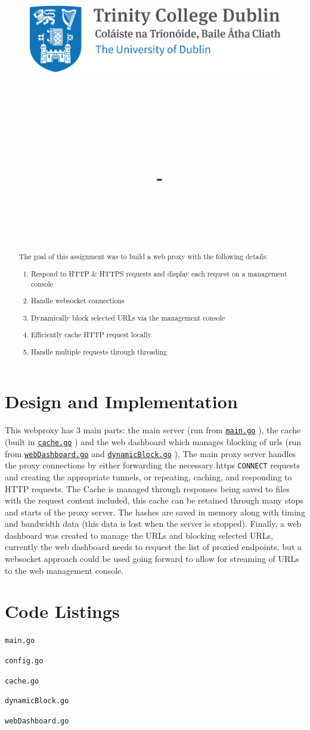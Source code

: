 \documentclass{article}
\title{
    \vspace{-1in}
    \begin{figure}[!ht]
    \flushleft
    \includegraphics[width=0.4\linewidth]{reduced-trinity.png}
    \end{figure}
    \vspace{-0.5cm}
    \hrulefill \\
    \vspace{1cm}
    \textmd{\textbf{\moduleCode\ \moduleName}}\\
    \textmd{\textbf{\assignmentTitle}}\\
    \textmd{\authorName\ - \authorID}\\
    \textmd{\reportDate}\\
    \vspace{0.5cm}
    \hrulefill \\
}
\date{}
\author{}
\newcommand{\code}[1]{\colorbox{light-gray}{\texttt{#1}}}
\newcommand{\codelisting}[1]{
  \code{#1}
  \label{code:#1}
  
  \vspace{2em}
}
\newcommand{\coderef}[1]{
  \hyperref[code:#1]{\code{#1}}
}
\begin{document}
    \lstset{language=bash, float=h, captionpos=b, frame=single, numbers=left, numberblanklines=false, numberstyle=\tiny, numbersep=1mm, framexleftmargin=3mm, xleftmargin=5mm, aboveskip=3mm, breaklines=true}
    \captionsetup{width=.8\linewidth} 

    \maketitle
    \begin{abstract}
      The goal of this assignment was to build a web proxy with the following details:
      \begin{enumerate}
        \item Respond to HTTP \& HTTPS requests and display each request on a management console
        \item Handle websocket connections
        \item Dynamically block selected URLs via the management console
        \item Efficiently cache HTTP request locally
        \item Handle multiple requests through threading
      \end{enumerate}
    \end{abstract}
    \tableofcontents
    \newpage
    
    \section{Design and Implementation}
    \label{sec:Design}
    This webproxy has 3 main parts: the main server (run from \coderef{main.go}), the cache (built in \coderef{cache.go}) and the web dashboard which manages blocking of urls (run from \coderef{webDashboard.go} and \coderef{dynamicBlock.go}). The main proxy server handles the proxy connections by either forwarding the necessary https \code{CONNECT} requests and creating the appropriate tunnels, or repeating, caching, and responding to HTTP requests. The Cache is managed through responses being saved to files with the request content included, this cache can be retained through many stops and starts of the proxy server. The hashes are saved in memory along with timing and bandwidth data (this data is lost when the server is stopped). Finally, a web dashboard was created to manage the URLs and blocking selected URLs, currently the web dashboard needs to request the list of proxied endpoints, but a websocket approach could be used going forward to allow for streaming of URLs to the web management console.
    \newpage
    \section{Code Listings}
    \label{sec:codeListing}
    \codelisting{main.go}
    \codelisting{config.go}
    \codelisting{cache.go}
    \codelisting{dynamicBlock.go}
    \codelisting{webDashboard.go}
    
\end{document}
